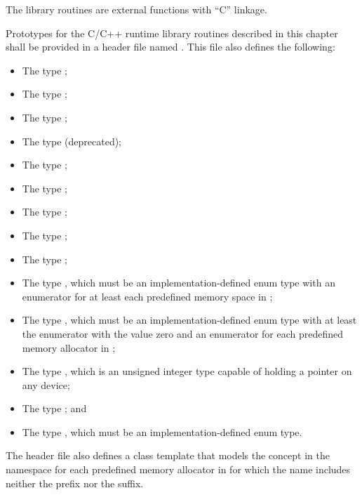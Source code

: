 \begin{ccppspecific}
The library routines are external functions with ``C'' linkage.

Prototypes for the C/C++ runtime library routines described in this 
chapter shall be provided in a header file named . This 
file also defines the following:

\begin{itemize}
\item The type ;
\item The type ;
\item The type ;
\item The type  (deprecated);
\item The type ;
\item The type ;
\item The type ;
\item The type ;
\item The type ;
\item The type , which must be an 
      implementation-defined enum type with an enumerator for 
      at least each predefined memory space in 
      ;
\item The type , which must be an
      implementation-defined enum type with at least the 
       enumerator with the value 
      zero and an enumerator for each predefined memory allocator 
      in ;
\item The type , which is an unsigned integer type 
      capable of holding a pointer on any device;
\item The type ; and
\item The type , which must be an 
      implementation-defined enum type.
\end{itemize}
\end{ccppspecific}

\begin{cppspecific}
The  header file also defines a class template that
models the  concept in the 
namespace for each predefined memory allocator in
 for which the name includes
neither the  prefix nor the  suffix.
\end{cppspecific}

